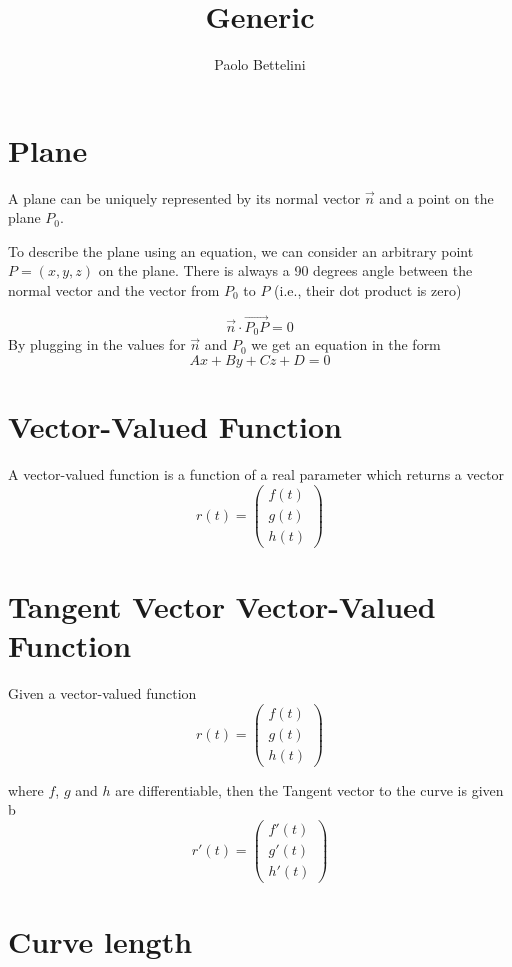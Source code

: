 \documentclass[a4paper]{article}
\title{Generic}
\author{Paolo Bettelini}
\date{}
\begin{document}
\section{Plane}

A plane can be uniquely represented by its
normal vector \(\vec{n}\)
and a point on the plane \(P_0\).

To describe the plane using an equation, we can
consider an arbitrary point \(P=(x,y,z)\) on the plane.
There is always a 90 degrees angle between the normal
vector and the vector from \(P_0\) to \(P\) (i.e., their dot product is zero)

\[
    \vec{n} \cdot \overrightarrow{P_0 P} = 0
\]
By plugging in the values for \(\vec{n}\) and \(P_0\)
we get an equation in the form
\[
    Ax+By+Cz+D=0
\]

\section{Vector-Valued Function}

A vector-valued function is a function of a real parameter
which returns a vector
\[
    r(t) = \begin{pmatrix}
        f(t) \\
        g(t) \\
        h(t)
    \end{pmatrix}
\]

\section{Tangent Vector Vector-Valued Function}

Given a vector-valued function
\[
    r(t) = \begin{pmatrix}
        f(t) \\
        g(t) \\
        h(t)
    \end{pmatrix}
\]

where \(f\), \(g\) and \(h\) are differentiable,
then the Tangent vector to the curve is given b
\[
    r'(t) = \begin{pmatrix}
        f'(t) \\
        g'(t) \\
        h'(t)
    \end{pmatrix}
\]

\section{Curve length}
\end{document}
